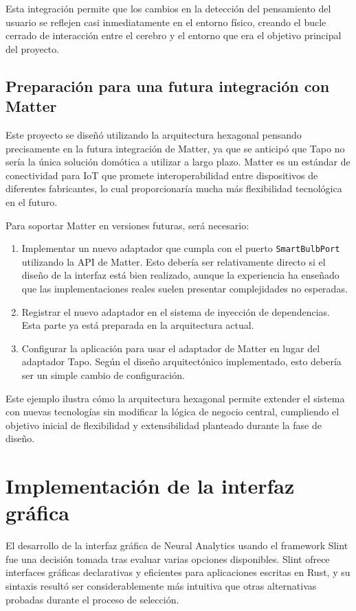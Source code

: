 Esta integración permite que los cambios en la detección del pensamiento del usuario se reflejen casi inmediatamente en el entorno físico, creando el bucle cerrado de interacción entre el cerebro y el entorno que era el objetivo principal del proyecto.

\newpage
\subsection{Preparación para una futura integración con Matter}

Este proyecto se diseñó utilizando la arquitectura hexagonal pensando precisamente en la futura integración de Matter, ya que se anticipó que Tapo no sería la única solución domótica a utilizar a largo plazo. Matter es un estándar de conectividad para IoT que promete interoperabilidad entre dispositivos de diferentes fabricantes, lo cual proporcionaría mucha más flexibilidad tecnológica en el futuro.

Para soportar Matter en versiones futuras, será necesario:

\begin{enumerate}
    \item Implementar un nuevo adaptador que cumpla con el puerto \texttt{SmartBulbPort} utilizando la API de Matter. Esto debería ser relativamente directo si el diseño de la interfaz está bien realizado, aunque la experiencia ha enseñado que las implementaciones reales suelen presentar complejidades no esperadas.
    \item Registrar el nuevo adaptador en el sistema de inyección de dependencias. Esta parte ya está preparada en la arquitectura actual.
    \item Configurar la aplicación para usar el adaptador de Matter en lugar del adaptador Tapo. Según el diseño arquitectónico implementado, esto debería ser un simple cambio de configuración.
\end{enumerate}

Este ejemplo ilustra cómo la arquitectura hexagonal permite extender el sistema con nuevas tecnologías sin modificar la lógica de negocio central, cumpliendo el objetivo inicial de flexibilidad y extensibilidad planteado durante la fase de diseño.

\section{Implementación de la interfaz gráfica}

El desarrollo de la interfaz gráfica de Neural Analytics usando el framework Slint fue una decisión tomada tras evaluar varias opciones disponibles. Slint ofrece interfaces gráficas declarativas y eficientes para aplicaciones escritas en Rust, y su sintaxis resultó ser considerablemente más intuitiva que otras alternativas probadas durante el proceso de selección.

